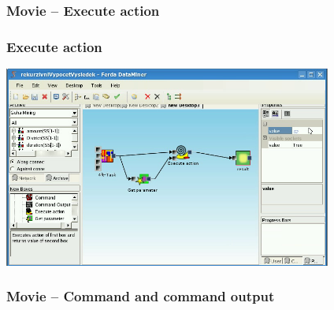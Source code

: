 \documentclass{beamer}
\begin{document}
\begin{frame}
	\frametitle{Movie -- Execute action}
\end{frame}

\begin{frame}
	\frametitle{Execute action}
	\includegraphics[width=10.8cm]{executeAction2.png}
\end{frame}

\begin{frame}
	\frametitle{Movie -- Command and command output}
\end{frame}
\end{document}
